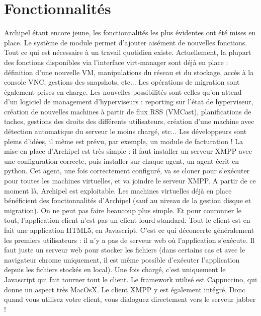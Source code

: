\section{Fonctionnalités}
Archipel étant encore jeune, les fonctionnalités les plus évidentes ont été mises en place. Le système de
module permet d'ajouter aisément de nouvelles fonctions. Tout ce qui est nécessaire à un travail
quotidien existe.\newline
Actuellement, la plupart des fonctions disponibles via l'interface virt-manager sont déjà en place :
définition d'une nouvelle VM, manipulations du réseau et du stockage, accès à la console VNC, gestions
des snapshots, etc... Les opérations de migration sont également prises en charge. Les nouvelles
possibilités sont celles qu'on attend d'un logiciel de management d'hyperviseurs : reporting sur l'état de
hyperviseur, création de nouvelles machines à partir de flux RSS (VMCast), planifications de taches,
gestions des droits des différents utilisateurs, création d'une machine avec détection automatique du
serveur le moins chargé, etc... Les développeurs sont pleins d'idées, il même est prévu, par exemple, un
module de facturation !\newline
La mise en place d'Archipel est très simple : il faut installer un serveur XMPP avec une configuration
correcte, puis installer sur chaque agent, un agent écrit en python. Cet agent, une fois correctement
configuré, va se cloner pour s’exécuter pour toutes les machines virtuelles, et va joindre le serveur XMPP.
A partir de ce moment là, Archipel est exploitable. Les machines virtuelles déjà en place bénéficient des
fonctionnalités d'Archipel (sauf au niveau de la gestion disque et migration). On ne peut pas faire
beaucoup plus simple.\newline
Et pour couronner le tout, l'application client n'est pas un client lourd standard. Tout le client est en fait
une application HTML5, en Javascript. C'est ce qui déconcerte généralement les premiers utilisateurs : il
n'y a pas de serveur web où l'application s’exécute. Il faut juste un serveur web pour stocker les fichiers
(dans certains cas et avec le navigateur chrome uniquement, il est même possible d’exécuter l'application
depuis les fichiers stockés en local). Une fois chargé, c'est uniquement le Javascript qui fait tourner tout le
client. Le framework utilisé est Cappuccino, qui donne un aspect très MacOsX. Le client XMPP y est
également intégré. Donc quand vous utilisez votre client, vous dialoguez directement vers le serveur
jabber !

